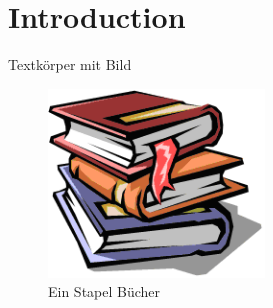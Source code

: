 %
%
% 
% 
% 


\chapter{Introduction}
\label{chap:intro}

Textkörper mit Bild

\begin{figure}[htbp]
	\centering
		\includegraphics[height=5cm]{images/buecher}
	\caption{Ein Stapel Bücher}
	\label{fig:buecher}
\end{figure}



